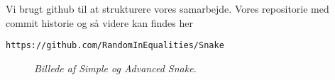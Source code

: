 Vi brugt github til at strukturere vores samarbejde. Vores repositorie med commit historie og så videre kan findes her
\begin{center}
\texttt{https://github.com/RandomInEqualities/Snake}
\end{center}

\begin{figure}
	\centering
	\hspace{0.1\textwidth}
	\caption{\textit{Billede af Simple og Advanced Snake.}}
\end{figure}